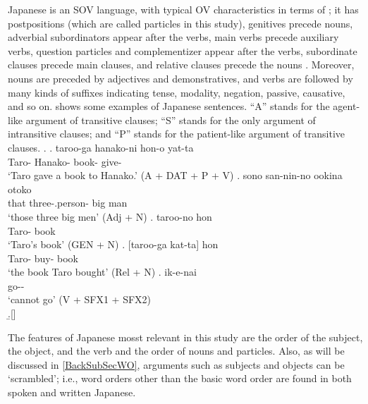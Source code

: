 Japanese is an SOV language, with typical OV characteristics
in terms of ;
it has postpositions (which are called particles in this study),
genitives precede nouns,
adverbial subordinators appear after the verbs,
main verbs precede auxiliary verbs,
question particles and complementizer appear after the verbs,
subordinate clauses precede main clauses, and
relative clauses precede the nouns
\cite{shibatani90,masuokatakubo92}.
Moreover,
nouns are preceded by adjectives and demonstratives,
and verbs are followed by many kinds of suffixes indicating tense, modality, negation, passive, causative, and so on.
\Next shows some examples of Japanese sentences.
``A'' stands for the agent-like argument of transitive clauses;
``S'' stands for the only argument of intransitive clauses; and
``P'' stands for the patient-like argument of transitive clauses.
%
\ex.
     \ag. taroo-ga hanako-ni hon-o yat-ta \\
        Taro- Hanako- book- give- \\
        `Taro gave a book to Hanako.' \hfill{(A + DAT + P + V)}
     \bg. sono san-nin-no ookina otoko \\
          that three-.person- big man \\
          `those three big men' \hfill{(Adj + N)}
     \bg. taroo-no hon \\
          Taro- book \\
          `Taro's book' \hfill{(GEN + N)}
     \bg. [taroo-ga kat-ta] hon \\
           Taro- buy- book \\
           `the book Taro bought' \hfill{(Rel + N)}
     \bg. ik-e-nai \\
          go-- \\
          `cannot go' \hfill{(V + SFX1 + SFX2)} \\
     \b.[] \hfill{\cite[257--258, glosses modified by NN]{shibatani90}}

The features of Japanese mosst relevant in this study are the order of the subject, the object, and the verb and the order of nouns and particles.
Also, as will be discussed in \ref{BackSubSecWO},
arguments such as subjects and objects can be `scrambled';
i.e., word orders other than the basic word order are found in both spoken and written Japanese.

